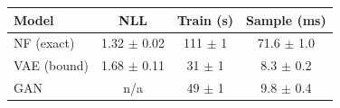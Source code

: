 \begin{tabular}{lccc}
\hline
Model & NLL & Train (s) & Sample (ms) \\
\hline
NF (exact) & 1.32 $\pm$ 0.02 & 111 $\pm$ 1 & 71.6 $\pm$ 1.0 \\
VAE (bound) & 1.68 $\pm$ 0.11 & 31 $\pm$ 1 & 8.3 $\pm$ 0.2 \\
GAN & n/a & 49 $\pm$ 1 & 9.8 $\pm$ 0.4 \\
\hline
\end{tabular}
